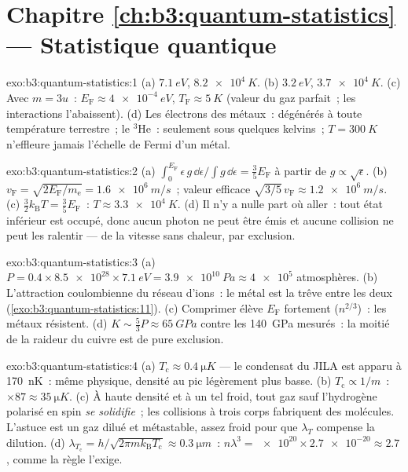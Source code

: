 \section*{Chapitre \ref{ch:b3:quantum-statistics} --- Statistique quantique}

\begin{solution}{exo:b3:quantum-statistics:1}
(a) $\qty{7.1}{eV}$, $\qty{8.2e4}{K}$. (b) $\qty{3.2}{eV}$,
$\qty{3.7e4}{K}$. (c) Avec $m = 3u$~: $E_{\text{F}} \approx
\qty{4e-4}{eV}$, $T_{\text{F}} \approx \qty{5}{K}$ (valeur du gaz
parfait~; les interactions l'abaissent). (d) Les électrons des
métaux~: dégénérés à toute température terrestre~; le $^3$He~:
seulement sous quelques kelvins~; $T = \qty{300}{K}$ n'effleure
jamais l'échelle de Fermi d'un métal.
\end{solution}

\begin{solution}{exo:b3:quantum-statistics:2}
(a) $\int_0^{E_{\text{F}}}\epsilon\,g\,\dd\epsilon/\int g\,\dd
\epsilon = \tfrac35 E_{\text{F}}$ à partir de $g \propto \sqrt\epsilon$.
(b) $v_{\text{F}} = \sqrt{2E_{\text{F}}/m_{\text{e}}} =
\qty{1.6e6}{m/s}$~; valeur efficace $\sqrt{3/5}\,v_{\text{F}} \approx
\qty{1.2e6}{m/s}$. (c) $\tfrac32 k_{\text{B}}T = \tfrac35
E_{\text{F}}$~: $T \approx \qty{3.3e4}{K}$. (d) Il n'y a nulle part
où aller~: tout état inférieur est occupé, donc aucun photon ne peut
être émis et aucune collision ne peut les ralentir --- de la vitesse
sans chaleur, par exclusion.
\end{solution}

\begin{solution}{exo:b3:quantum-statistics:3}
(a) $P = 0.4 \times \num{8.5e28} \times \qty{7.1}{eV} =
\qty{3.9e10}{Pa} \approx \num{4e5}$ atmosphères. (b) L'attraction
coulombienne du réseau d'ions~: le métal est la trêve entre les deux
(\cref{exo:b3:quantum-statistics:11}). (c) Comprimer élève
$E_{\text{F}}$ fortement ($n^{2/3}$)~: les métaux résistent. (d) $K \sim
\tfrac53 P \approx \qty{65}{GPa}$ contre les \qty{140}{GPa}
mesurés~: la moitié de la raideur du cuivre est de pure exclusion.
\end{solution}

\begin{solution}{exo:b3:quantum-statistics:4}
(a) $T_{\text{c}} \approx \qty{0.4}{\micro K}$ --- le condensat du
JILA est apparu à \qty{170}{nK}~: même physique, densité au pic
légèrement plus basse. (b) $T_{\text{c}} \propto 1/m$~: $\times87 \approx
\qty{35}{\micro K}$. (c) À haute densité et à un tel froid, tout gaz
sauf l'hydrogène polarisé en spin \emph{se solidifie}~; les
collisions à trois corps fabriquent des molécules. L'astuce est un
gaz dilué et métastable, assez froid pour que $\lambda_T$ compense la
dilution. (d)
$\lambda_{T_{\text{c}}} = h/\sqrt{2\pi mk_{\text{B}}T_{\text{c}}}
\approx \qty{0.3}{\micro m}$~: $n\lambda^3 = \num{e20} \times
\num{2.7e-20} \approx 2.7$, comme la règle l'exige.
\end{solution}

